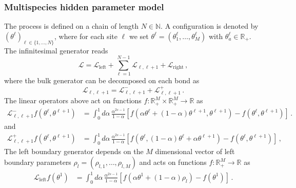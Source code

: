 \documentclass[11pt]{article}
\numberwithin{equation}{section}
\newcommand{\M}{M}
\newcommand{\N}{N}
\newcommand{\ecL}{\bm{\mathscr{L}}}
\newcommand{\hidden}{\theta}
\begin{document}
\subsubsection{Multispecies hidden parameter model}\label{sec:hidden}
The process is defined on a chain of length $\N\in\mathbb{N}$. A configuration is denoted by $(\hidden^{\ell})_{\ell\in\{1,\ldots,\N\}}$, where for each site $\ell$ we set $\hidden^{\ell}=(\hidden_{1}^{\ell},\ldots,\hidden_{\M}^{\ell})$ with $\hidden_{a}^{\ell}\in \mathbb{R}_{+}$. 
The infinitesimal generator reads 
\begin{equation}\label{generator-Hidden} 
	\ecL=\ecL_{\text{left}}+\sum_{\ell=1}^{\N-1}\ecL_{\ell,\ell+1}+\ecL_{\text{right}}\,,
\end{equation}
where the bulk generator can be decomposed on each bond as
\begin{equation}\label{generator-bulk-hidden}
	\ecL_{\ell,\ell+1}=\ecL^-_{\ell,\ell+1}+\ecL^+_{\ell,\ell+1}\,.
\end{equation}
The linear operators above act on functions $f:\mathbb{R}_{+}^{\M}\times \mathbb{R}_{+}^{\M}\to \mathbb{R}$ as 
\begin{equation}\label{generatorMinus-heat}
	\begin{split}
		\ecL^{-}_{\ell,\ell+1}f(\hidden^{\ell},\hidden^{\ell+1})&= \int_0^1d\alpha\,\frac{\alpha ^{2s-1}}{1-\alpha}\left[f(\alpha \hidden^{\ell}+(1-\alpha)\hidden^{\ell+1},\hidden^{\ell+1})-f(\hidden^{\ell},\hidden^{\ell+1})\right]\,.
	\end{split}
\end{equation}
and
\begin{equation}\label{generatorPlus-heat}
	\begin{split}
		\ecL^{+}_{\ell,\ell+1} f(\hidden^{\ell},\hidden^{\ell+1})&= \int_0^1d\alpha\,\frac{\alpha ^{2s-1}}{1-\alpha }\left[f(\hidden^{\ell},
        (1-\alpha)\hidden^{\ell} +
        \alpha \hidden^{\ell+1})-f(\hidden^{\ell},\hidden^{\ell+1})\right]\,,
	\end{split}
\end{equation}
The left boundary generator depends on the $\M$ dimensional vector of left boundary parameters $\rho_{l}=(\rho_{l,1},\ldots,\rho_{l,\M})$ and acts on functions $f:\mathbb{R}_{+}^{\M}\to \mathbb{R}$ as
\begin{equation}\label{redR2sl2int4w}
	\begin{split}
		\ecL_{\text{left}} f(\hidden^{1})&= \int_0^1d\alpha\,\frac{\alpha ^{2s-1}}{1-\alpha }\left[f(\alpha \hidden^{1}+(1-\alpha)\rho_{l})-f(\hidden^{1})\right]\,.
	\end{split}
\end{equation}
\end{document}
